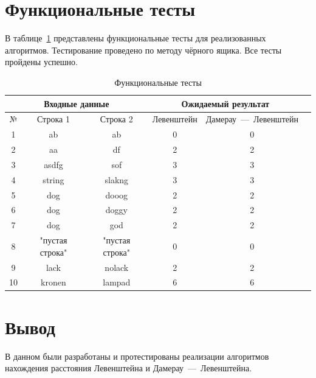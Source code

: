 \section{Функциональные тесты}

В таблице~\ref{tbl:func_tests} представлены функциональные тесты для реализованных алгоритмов. Тестирование проведено по методу чёрного ящика. Все тесты пройдены успешно.
\begin{table}[ht]
	\small
	\begin{center}
		\begin{threeparttable}
		\caption{Функциональные тесты}
		\label{tbl:func_tests}
		\begin{tabular}{|c|c|c|c|c|c|}
			\hline
			\multicolumn{3}{|c|}{\bfseries Входные данные} 
			& \multicolumn{2}{c|}{\bfseries Ожидаемый результат} \\ 
			\hline
			№ & Строка 1 & Строка 2 & Левенштейн & Дамерау~---~Левенштейн \\
			\hline
			1 & ab & ab & 0 & 0 \\
			\hline
			2 & aa & df & 2 & 2 \\
			\hline
			3 & asdfg & sof & 3 & 3 \\
			\hline
			4 & string & slakng & 3 & 3 \\
			\hline
			5 & dog & dooog & 2 & 2 \\
			\hline
			6 & dog & doggy & 2 & 2 \\
			\hline
			7 & dog & god & 2 & 2 \\
			\hline
			8 & "пустая строка" & "пустая строка" & 0 & 0 \\
			\hline
			9 & lack & nolack & 2 & 2 \\
			\hline
			10 & kronen & lampad & 6 & 6 \\
			\hline
		\end{tabular}	
		\end{threeparttable}
	\end{center}
\end{table}

\section*{Вывод}
В данном были разработаны и протестированы реализации алгоритмов нахождения расстояния Левенштейна и Дамерау~---~Левенштейна.